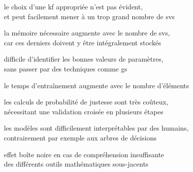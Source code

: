 \begin{itmz}

\item{le choix d’une \gls{kf} appropriée n’est pas évident,\\
et peut facilement mener à un trop grand nombre de \glspl{sv}}

\end{itmz}\begin{itmz}

\item{la mémoire nécessaire augmente avec le nombre de \glspl{sv},\\
car ces derniers doivent y être intégralement stockés}

\end{itmz}\begin{itmz}

\item{difficile d’identifier les bonnes valeurs de paramètres,\\
sans passer par des techniques comme \gls{gs}}

\end{itmz}\begin{itmz}

\item{le temps d’entraînement augmente avec le nombre d’éléments}

\end{itmz}\begin{itmz}

\item{les calculs de probabilité de justesse sont très coûteux,\\
nécessitant une validation croisée en plusieurs étapes}

\end{itmz}\begin{itmz}

\item{les modèles sont difficilement interprétables par des humains,\\
contrairement par exemple aux arbres de décisions}

\end{itmz}\begin{itmz}

\item{effet boîte noire en cas de compréhension insuffisante\\
des différents outils mathématiques sous-jacents}

\end{itmz}


